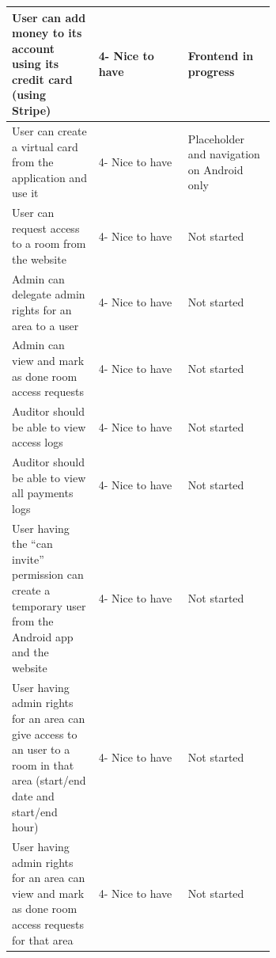 \documentclass[11pt,a4paper]{report}
\begin{document}
\begin{longtable}[c]{|p{0.33\linewidth}|l|p{0.33\linewidth}|}
User can add money to its account using its credit card (using Stripe)                                                                         & 4- Nice to have   & Frontend in progress                             \\ \hline
User can create a virtual card from the application and use it                                                                                 & 4- Nice to have   & Placeholder and navigation on Android only       \\ \hline
User can request access to a room from the website                                                                                             & 4- Nice to have   & Not started                                      \\ \hline
Admin can delegate admin rights for an area to a user                                                                                          & 4- Nice to have   & Not started                                      \\ \hline
Admin can view and mark as done room access requests                                                                                           & 4- Nice to have   & Not started                                      \\ \hline
Auditor should be able to view access logs                                                                                                     & 4- Nice to have   & Not started                                      \\ \hline
Auditor should be able to view all payments logs                                                                                               & 4- Nice to have   & Not started                                      \\ \hline
User having the “can invite” permission can create a temporary user from the Android app and the website                                       & 4- Nice to have   & Not started                                      \\ \hline
User having admin rights for an area can give access to an user to a room in that area (start/end date and start/end hour)                     & 4- Nice to have   & Not started                                      \\ \hline
User having admin rights for an area can view and mark as done room access requests for that area                                              & 4- Nice to have   & Not started                                      \\ \hline

\end{longtable}
\end{document}
